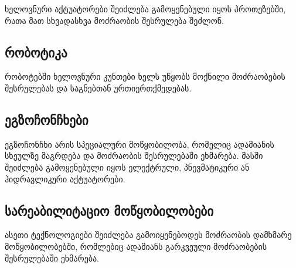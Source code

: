 \documentclass[12pt,a4paper]{article}
\begin{document}
\begin{center}
\end{center}

ხელოვნური აქტუატორები შეიძლება გამოყენებული იყოს პროთეზებში, რათა მათ სხვადასხვა მოძრაობის შესრულება შეძლონ.

\subsection{რობოტიკა}

\begin{center}
\end{center}

რობოტებში ხელოვნური კუნთები ხელს უწყობს მოქნილი მოძრაობების შესრულებას და საგნებთან ურთიერთქმედებას.

\subsection{ეგზოჩონჩხები}

ეგზოჩონჩხი არის სპეციალური მოწყობილობა, რომელიც ადამიანის სხეულზე მაგრდება და მოძრაობის შესრულებაში ეხმარება. მასში შეიძლება გამოყენებული იყოს ელექტრული, პნევმატიკური ან ჰიდრავლიკური აქტუატორები.

\subsection{სარეაბილიტაციო მოწყობილობები}

ასეთი ტექნოლოგიები შეიძლება გამოიყენებოდეს მოძრაობის დამხმარე მოწყობილობებში, რომლებიც ადამიანს გარკვეული მოძრაობების შესრულებაში ეხმარება.

\end{document}
